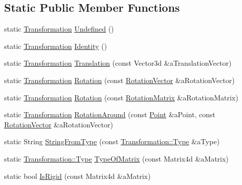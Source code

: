 \subsection*{Static Public Member Functions}
\begin{DoxyCompactItemize}
\item 
static \hyperlink{classostk_1_1math_1_1geom_1_1d3_1_1_transformation}{Transformation} \hyperlink{classostk_1_1math_1_1geom_1_1d3_1_1_transformation_afe6a425a70775b707f4627e714f19c1a}{Undefined} ()
\item 
static \hyperlink{classostk_1_1math_1_1geom_1_1d3_1_1_transformation}{Transformation} \hyperlink{classostk_1_1math_1_1geom_1_1d3_1_1_transformation_a0f62fb9a0404d46d875afa75092ab0aa}{Identity} ()
\item 
static \hyperlink{classostk_1_1math_1_1geom_1_1d3_1_1_transformation}{Transformation} \hyperlink{classostk_1_1math_1_1geom_1_1d3_1_1_transformation_a66013ed0dfecce2f0931bab9ce3235f8}{Translation} (const Vector3d \&a\+Translation\+Vector)
\item 
static \hyperlink{classostk_1_1math_1_1geom_1_1d3_1_1_transformation}{Transformation} \hyperlink{classostk_1_1math_1_1geom_1_1d3_1_1_transformation_ab6bce27c0f6bbfc6d89b7409320fa167}{Rotation} (const \hyperlink{classostk_1_1math_1_1geom_1_1d3_1_1trf_1_1rot_1_1_rotation_vector}{Rotation\+Vector} \&a\+Rotation\+Vector)
\item 
static \hyperlink{classostk_1_1math_1_1geom_1_1d3_1_1_transformation}{Transformation} \hyperlink{classostk_1_1math_1_1geom_1_1d3_1_1_transformation_a9513e711eed54a55f45e1c7d5e8e73b8}{Rotation} (const \hyperlink{classostk_1_1math_1_1geom_1_1d3_1_1trf_1_1rot_1_1_rotation_matrix}{Rotation\+Matrix} \&a\+Rotation\+Matrix)
\item 
static \hyperlink{classostk_1_1math_1_1geom_1_1d3_1_1_transformation}{Transformation} \hyperlink{classostk_1_1math_1_1geom_1_1d3_1_1_transformation_ad9a9f56f5d20f5b789fef9a320e229a4}{Rotation\+Around} (const \hyperlink{classostk_1_1math_1_1geom_1_1d3_1_1objects_1_1_point}{Point} \&a\+Point, const \hyperlink{classostk_1_1math_1_1geom_1_1d3_1_1trf_1_1rot_1_1_rotation_vector}{Rotation\+Vector} \&a\+Rotation\+Vector)
\item 
static String \hyperlink{classostk_1_1math_1_1geom_1_1d3_1_1_transformation_a69b2048fd161c6ea3a641acbd638325b}{String\+From\+Type} (const \hyperlink{classostk_1_1math_1_1geom_1_1d3_1_1_transformation_a04794da018108a1e973dad364c32b4ec}{Transformation\+::\+Type} \&a\+Type)
\item 
static \hyperlink{classostk_1_1math_1_1geom_1_1d3_1_1_transformation_a04794da018108a1e973dad364c32b4ec}{Transformation\+::\+Type} \hyperlink{classostk_1_1math_1_1geom_1_1d3_1_1_transformation_aa66bff4c95399e4068ef38316658bf09}{Type\+Of\+Matrix} (const Matrix4d \&a\+Matrix)
\item 
static bool \hyperlink{classostk_1_1math_1_1geom_1_1d3_1_1_transformation_a9197762af4f8ab4b2481036e74725ac3}{Is\+Rigid} (const Matrix4d \&a\+Matrix)
\end{DoxyCompactItemize}
